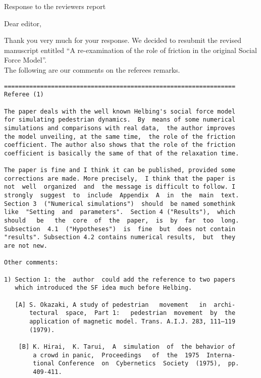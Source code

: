 \documentclass[a4paper,12pt]{letter}
\begin{document}

\begin{letter}{Response to the reviewers report}

\opening{}

Dear editor, 

Thank you very much for your response. We decided to resubmit the revised manuscript entitled
 ``A re-examination of the role of friction in the original Social Force Model''. \\
The following are our comments on the referees remarks.



\begin{verbatim}
================================================================
Referee (1)

The paper deals with the well known Helbing's social force model
for simulating pedestrian dynamics.  By  means of some numerical
simulations and comparisons with real data,  the author improves
the model unveiling, at the same time,  the role of the friction
coefficient. The author also shows that the role of the friction
coefficient is basically the same of that of the relaxation time.

The paper is fine and I think it can be published, provided some
corrections are made. More precisely,  I think that the paper is 
not  well  organized  and  the message is difficult to follow. I
strongly  suggest  to  include  Appendix  A  in  the  main  text. 
Section 3  ("Numerical simulations")  should  be named somethink 
like  "Setting  and  parameters".  Section 4 ("Results"),  which 
should   be   the  core  of  the  paper,  is  by  far  too  long. 
Subsection  4.1  ("Hypotheses")  is  fine  but  does not contain 
"results". Subsection 4.2 contains numerical results,  but  they
are not new.

Other comments:

1) Section 1: the  author  could add the reference to two papers
   which introduced the SF idea much before Helbing.

   [A] S. Okazaki, A study of pedestrian   movement   in  archi-
       tectural  space,  Part 1:   pedestrian  movement  by  the 
       application of magnetic model. Trans. A.I.J. 283, 111–119
       (1979).

    [B] K. Hirai,  K. Tarui,  A  simulation  of  the behavior of
        a crowd in panic,  Proceedings   of  the  1975  Interna-
        tional Conference  on  Cybernetics  Society  (1975),  pp.
        409-411.


\end{verbatim}
\end{letter}
\end{document}
